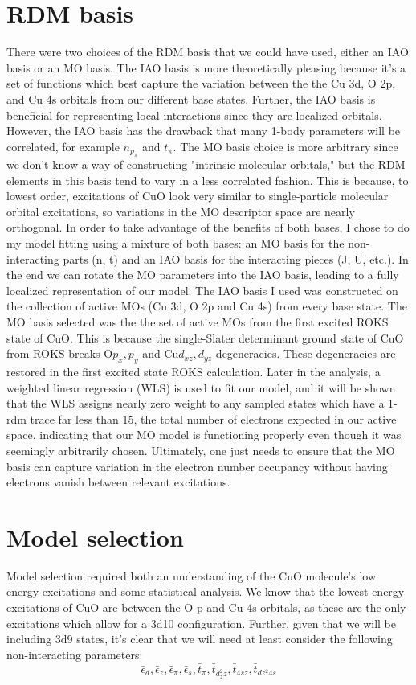 \documentclass{article}
\begin{document}
\section{RDM basis}
There were two choices of the RDM basis that we could have used, either an IAO basis or an MO basis. The IAO basis is more theoretically pleasing because it's a set of functions which best capture the variation between the the Cu 3d, O 2p, and Cu 4s orbitals from our different base states. Further, the IAO basis is beneficial for representing local interactions since they are localized orbitals. However, the IAO basis has the drawback that many 1-body parameters will be correlated, for example $n_{p_\pi}$ and $t_\pi$. The MO basis choice is more arbitrary since we don't know a way of constructing "intrinsic molecular orbitals," but the RDM elements in this basis tend to vary in a less correlated fashion. This is because, to lowest order, excitations of CuO look very similar to single-particle molecular orbital excitations, so variations in the MO descriptor space are nearly orthogonal. In order to take advantage of the benefits of both bases, I chose to do my model fitting using a mixture of both bases: an MO basis for the non-interacting parts (n, t) and an IAO basis for the interacting pieces (J, U, etc.). In the end we can rotate the MO parameters into the IAO basis, leading to a fully localized representation of our model. The IAO basis I used was constructed on the collection of active MOs (Cu 3d, O 2p and Cu 4s) from every base state. The MO basis selected was the the set of active MOs from the first excited ROKS state of CuO. This is because the single-Slater determinant ground state of CuO from ROKS breaks O$p_x, p_y$ and Cu$d_{xz}, d_{yz}$ degeneracies. These degeneracies are restored in the first excited state ROKS calculation. Later in the analysis, a weighted linear regression (WLS) is used to fit our model, and it will be shown that the WLS assigns nearly zero weight to any sampled states which have a 1-rdm trace far less than 15, the total number of electrons expected in our active space, indicating that our MO model is functioning properly even though it was seemingly arbitrarily chosen. Ultimately, one just needs to ensure that the MO basis can capture variation in the electron number occupancy without having electrons vanish between relevant excitations.

\section{Model selection}
Model selection required both an understanding of the CuO molecule's low energy excitations and some statistical analysis. We know that the lowest energy excitations of CuO are between the O p and Cu 4s orbitals, as these are the only excitations which allow for a 3d10 configuration. Further, given that we will be including 3d9 states, it's clear that we will need at least consider the following non-interacting parameters:
$$\bar{\epsilon}_d, \bar{\epsilon}_z, \bar{\epsilon}_\pi, \bar{\epsilon}_s, \bar{t}_\pi, \bar{t}_{d_z^2 z}, \bar{t}_{4s z}, \bar{t}_{dz^2 4s}$$
\end{document}
